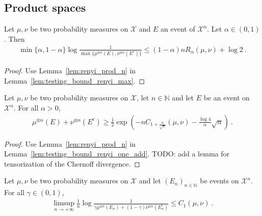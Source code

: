 \subsection{Product spaces}

\begin{corollary}
  \label{cor:testing_bound_renyi_n}
  Let $\mu, \nu$ be two probability measures on $\mathcal X$ and $E$ an event of $\mathcal X^n$. Let $\alpha \in (0,1)$. Then
  \begin{align*}
  \min\{\alpha, 1 - \alpha\} \log\frac{1}{\max\{\mu^{\otimes n}(E), \nu^{\otimes n}(E^c)\}} \le (1 - \alpha) n R_{\alpha}(\mu, \nu)  + \log 2 \: .
  \end{align*}
\end{corollary}

\begin{proof}
Use Lemma~\ref{lem:renyi_prod_n} in Lemma~\ref{lem:testing_bound_renyi_max}.
\end{proof}

\begin{lemma}
  \label{lem:testing_bound_renyi_one_add_n}
  Let $\mu, \nu$ be two probability measures on $\mathcal X$, let $n \in \mathbb{N}$ and let $E$ be an event on $\mathcal X^n$. For all $\alpha > 0$,
  \begin{align*}
  \mu^{\otimes n}(E) + \nu^{\otimes n}(E^c) \ge \frac{1}{2}\exp\left( - n C_{1+\frac{\alpha}{\sqrt{n}}}(\mu, \nu) - \frac{\log 4}{\alpha}\sqrt{n}\right) \: .
  \end{align*}
\end{lemma}

\begin{proof}
Use Lemma~\ref{lem:renyi_prod_n} in Lemma~\ref{lem:testing_bound_renyi_one_add}. TODO: add a lemma for tensorization of the Chernoff divergence.
\end{proof}

\begin{theorem}
  \label{thm:testing_bound_chernoff}
  Let $\mu, \nu$ be two probability measures on $\mathcal X$ and let $(E_n)_{n \in \mathbb{N}}$ be events on $\mathcal X^n$. For all $\gamma \in (0,1)$,
  \begin{align*}
  \limsup_{n \to +\infty} \frac{1}{n}\log \frac{1}{\gamma \mu^{\otimes n}(E_n) + (1 - \gamma)\nu^{\otimes n}(E_n^c)}
  \le C_1(\mu, \nu)
  \: .
  \end{align*}
\end{theorem}

